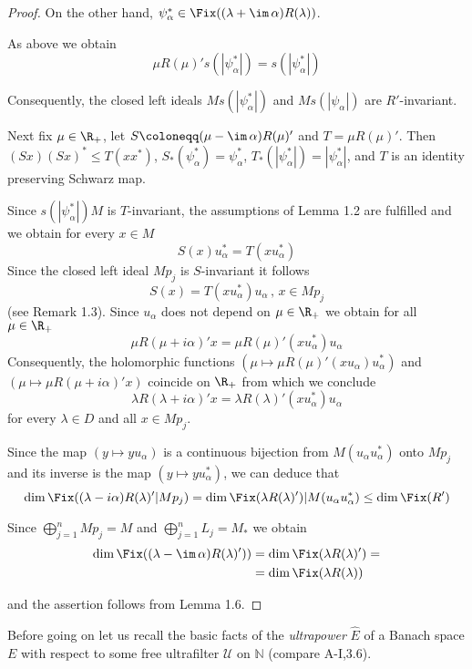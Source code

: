 \begin{proof}
On the other hand, $\psi_{\alpha}^{*} \in \Fix((\lambda + \im\,\alpha)R(\lambda))$.

As above we obtain
\[
\mu R(\mu)'s(|\psi_{\alpha}^{*}|) = s(|\psi_{\alpha}^{*}|)
\]

Consequently, the closed left ideals $Ms(|\psi_{\alpha}^{*}|)$ and $Ms(|\psi_{\alpha}|)$ are $R'$-invariant.

Next fix $\mu \in \R_{+}$, let $S \coloneqq (\mu - \im\,\alpha)R(\mu)'$ and $T = \mu R(\mu)'$.
Then $(Sx)(Sx)^{*} \leq T(xx^{*})$, $S_{*}(\psi_{\alpha}^{*}) = \psi_{\alpha}^{*}$, $T_{*}(|\psi_{\alpha}^{*}|) = |\psi_{\alpha}^{*}|$, and $T$ is an identity preserving Schwarz map.

Since $s(|\psi_{\alpha}^{*}|)M$ is $T$-invariant, the assumptions of Lemma 1.2 are fulfilled and we obtain for every $x \in M$
\[
S(x)u_{\alpha}^{*} = T(xu_{\alpha}^{*})
\]
Since the closed left ideal $Mp_{j}$ is $S$-invariant it follows
\[
S(x) = T(xu_{\alpha}^{*})u_{\alpha} \, , \, x \in Mp_{j}
\]
(see Remark 1.3).
Since $u_{\alpha}$ does not depend on $\mu \in \R_{+}$ we obtain for all $\mu \in \R_{+}$
\[
\mu R(\mu+i\alpha)'x = \mu R(\mu)'(xu_{\alpha}^{*})u_{\alpha}
\]
Consequently, the holomorphic functions $(\mu \mapsto \mu R(\mu)'(xu_{\alpha})u_{\alpha}^{*})$ and $(\mu \mapsto \mu R(\mu+i\alpha)'x)$ coincide on $\R_{+}$ from which we conclude
\[
\lambda R(\lambda+i\alpha)'x = \lambda R(\lambda)'(xu_{\alpha}^{*})u_{\alpha}
\]
for every $\lambda \in D$ and all $x \in Mp_{j}$.

Since the map $(y \mapsto yu_{\alpha})$ is a continuous bijection from $M(u_{\alpha}u_{\alpha}^{*})$ onto $Mp_{j}$ and its inverse is the map $(y \mapsto yu_{\alpha}^{*})$, we can deduce that
\[
\dim \Fix((\lambda-i\alpha)R(\lambda)'|Mp_{j}) = \dim \Fix(\lambda R(\lambda)')|M(u_{\alpha}u_{\alpha}^{*}) \leq \dim \Fix(R')
\]

Since $\bigoplus_{j=1}^{n} Mp_{j} = M$ and $\bigoplus_{j=1}^{n} L_{j} = M_{*}$ we obtain
\begin{align*}
\dim \Fix((\lambda - \im\,\alpha)R(\lambda)')) &= \dim \Fix(\lambda R(\lambda)') = \\
&= \dim \Fix(\lambda R(\lambda))
\end{align*}






and the assertion follows from Lemma 1.6.
\end{proof}
Before going on let us recall the basic facts of the \emph{ultrapower} $\hat{E}$ of a Banach space $E$ with respect to some free ultrafilter $\mathcal{U}$ on $\mathbb{N}$ (compare A-I,3.6).

